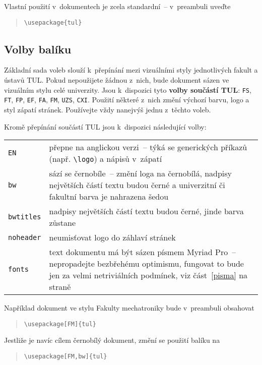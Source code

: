 \documentclass[a4paper,12pt,twoside]{article}
\newcommand{\cmdfont}[1]{\texttt{\color{\tulcolor}#1}}
\newcommand{\cmd}[1]{\cmdfont{\textbackslash #1}}
\begin{document}
Vlastní použití v~dokumentech je zcela standardní~-- v~preambuli uveďte

\begin{quote}
\cmd{usepackage\{tul\}}
\end{quote}

\subsection*{Volby balíku}

Základní sada voleb slouží k~přepínání mezi vizuálními styly jednotlivých
fakult a ústavů TUL. Pokud nepoužijete žádnou z~nich, bude dokument sázen ve
vizuálním stylu celé univerzity. Jsou k~dispozici tyto \textbf{volby součástí
TUL}: \cmdfont{FS}, \cmdfont{FT}, \cmdfont{FP}, \cmdfont{EF}, \cmdfont{FA},
\cmdfont{FM}, \cmdfont{UZS}, \cmdfont{CXI}. Použití některé z~nich změní
výchozí barvu, logo a styl zápatí stránek. Používejte vždy nanejvýš jednu
z~těchto voleb.

Kromě přepínání součástí TUL jsou k~dispozici následující volby:

\medskip

\begin{tabularx}{\textwidth}{@{}lX}
\cmdfont{EN} & přepne na anglickou verzi~-- týká se generických příkazů
(např. \cmd{logo}) a nápisů v~zápatí\\
\cmdfont{bw} & sází se černobíle~-- změní loga na černobílá, nadpisy největších
částí textu budou černé a univerzitní či fakultní barva je nahrazena šedou \\
\cmdfont{bwtitles} & nadpisy největších částí textu budou černé, jinde barva zůstane \\
\cmdfont{noheader} & neumisťovat logo do záhlaví stránek \\
\cmdfont{fonts} & text dokumentu má být sázen písmem Myriad Pro~-- nepropadejte
bezbřehému optimismu, fungovat to bude jen za velmi netriviálních podmínek, viz
část~\ref{pisma} na straně~\pageref{pisma}
\end{tabularx}

\medskip

Například dokument ve stylu Fakulty mechatroniky bude v~preambuli obsahovat

\begin{quote}
\cmd{usepackage[FM]\{tul\}}
\end{quote}

Jestliže je navíc cílem černobílý dokument, změní se použití balíku na

\begin{quote}
\cmd{usepackage[FM,bw]\{tul\}}
\end{quote}
\end{document}
